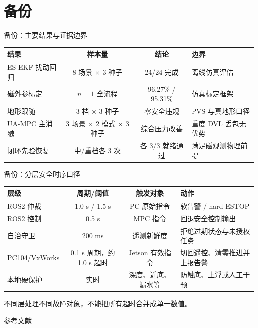 \appendix
\section{备份}

\begin{frame}{备份：主要结果与证据边界}
  \scriptsize
  \begin{tabularx}{\linewidth}{lccX}
    \toprule
    结果 & 样本量 & 结论 & 边界 \\
    \midrule
    ES-EKF 扰动回归 & 8 场景 \(\times\) 3 种子 & 24/24 完成 & 离线仿真评估 \\
    磁外参标定 & \(n=1\) 全流程 & 96.27\% / 95.31\% & 仿真标定框架 \\
    地形跟随 & 3 档 \(\times\) 3 种子 & 零安全违规 & PVS 与真地形口径 \\
    UA-MPC 主消融 & 3 场景 \(\times\) 2 模式 \(\times\) 3 种子 & 综合压力改善 & 重度 DVL 丢包无优势 \\
    闭环先验恢复 & 中/重档各 3 次 & 各 3/3 就绪通过 & 满足磁观测物理前提 \\
    \bottomrule
  \end{tabularx}
\end{frame}

\begin{frame}{备份：分层安全时序口径}
  \small
  \begin{tabularx}{\linewidth}{lccX}
    \toprule
    层级 & 周期/阈值 & 触发对象 & 动作 \\
    \midrule
    ROS2 仲裁 & 1.0 s / 1.5 s & PC 原始指令 & 软告警 / hard ESTOP \\
    ROS2 控制 & 0.5 s & MPC 指令 & 回退安全控制输出 \\
    自治守卫 & 200 ms & 遥测新鲜度 & 拒绝过期状态与未授权任务 \\
    PC104/VxWorks & 0.1 s 周期，约 1.0 s 超时 & Jetson 有效指令 & 切回遥控、清零推进并上报告警 \\
    本地硬保护 & 实时 & 深度、近底、漏水等 & 防触底、上浮或人工干预 \\
    \bottomrule
  \end{tabularx}

  \vspace{3mm}
  \quad 不同层处理不同故障对象，不能把所有超时合并成单一数值。
\end{frame}

\begin{frame}[allowframebreaks]{参考文献}
  \nocite{dlt1278_2025}
  
  
\end{frame}
